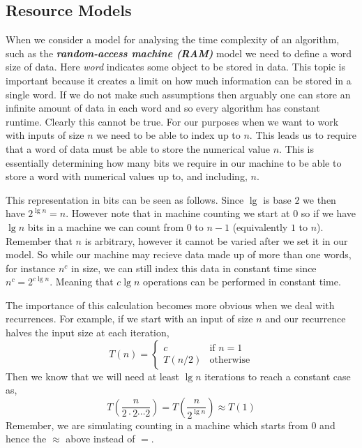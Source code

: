 \subsection*{Resource Models}

When we consider a model for analysing the time complexity of an algorithm, such as the
\textbf{\textit{random-access machine (RAM)}} model we need to define a word size of data. Here \textit{word}
indicates some object to be stored in data. This topic is important because it creates a limit on how much
information can be stored in a single word. If we do not make such assumptions then arguably one can store an
infinite amount of data in each word and so every algorithm has constant runtime. Clearly this cannot be true.
For our purposes when we want to work with inputs of size $n$ we need to be able to index up to $n$.
This leads us to require that a word of data must be able to store the numerical value $n$. This is
essentially determining how many bits we require in our machine to be able to store a word with numerical
values up to, and including, $n$.

This representation in bits can be seen as follows. Since $\lg$ is base $2$ we then have $2^{\lg n}=n$.
However note that in machine counting we start at $0$ so if we have $\lg n$ bits in a machine we can count
from $0$ to $n-1$ (equivalently $1$ to $n$). Remember that $n$ is arbitrary, however it cannot be varied
after we set it in our model. So while our machine may recieve data made up of more than one words, for
instance $n^{c}$ in size, we can still index this data in constant time since $n^{c} = 2^{c\lg n}$. Meaning
that $c\lg n$ operations can be performed in constant time.

The importance of this calculation becomes more obvious when we deal with recurrences. For example, if we
start with an input of size $n$ and our recurrence halves the input size at each iteration,
\begin{equation*}
	T(n) =
	\begin{cases}
		c& \text{if }n=1\\
		T(n/2)& \text{otherwise}
	\end{cases}
\end{equation*}
Then we know that we will need at least $\lg n$ iterations to reach a constant case as,
\begin{equation*}
	T\left(\frac{n}{2\cdot2\cdots2}\right) = T\left(\frac{n}{2^{\lg n}}\right)\approx T(1)
\end{equation*}
Remember, we are simulating counting in a machine which starts from $0$ and hence the $\approx$ above instead
of $=$.
